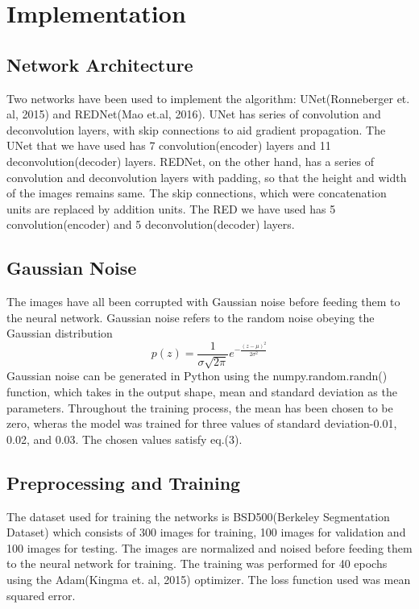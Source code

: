 \documentclass[journal]{IEEEtran} %
\begin{document}
\section{Implementation}
\subsection{Network Architecture}
Two networks have been used to implement the algorithm: UNet(Ronneberger et. al, 2015) and REDNet(Mao et.al, 2016). UNet has series of convolution and deconvolution layers, with skip connections to aid gradient propagation. The UNet that we have used has 7 convolution(encoder) layers and 11 deconvolution(decoder) layers. REDNet, on the other hand, has a series of convolution and deconvolution layers with padding, so that the height and width of the images remains same. The skip connections, which were concatenation units are replaced by addition units. The RED we have used has 5 convolution(encoder) and 5 deconvolution(decoder) layers.

\subsection{Gaussian Noise}
The images have all been corrupted with Gaussian noise before feeding them to the neural network. Gaussian noise refers to the random noise obeying the Gaussian distribution
\begin{equation}
    p(z) = \frac{1}{\sigma\sqrt{2\pi}}e^{-\frac{(z - \mu)^2}{2\sigma^2}}
\end{equation}
Gaussian noise can be generated in Python using the numpy.random.randn() function, which takes in the output shape, mean and standard deviation as the parameters. Throughout the training process, the mean has been chosen to be zero, wheras the model was trained for three values of standard deviation-0.01, 0.02, and 0.03. The chosen values satisfy eq.(3).

\subsection{Preprocessing and Training}
The dataset used for training the networks is BSD500(Berkeley Segmentation Dataset) which consists of 300 images for training, 100 images for validation and 100 images for testing. The images are normalized and noised before feeding them to the neural network for training. The training was performed for 40 epochs using the Adam(Kingma et. al, 2015) optimizer. The loss function used was mean squared error.
\end{document}
